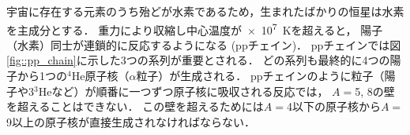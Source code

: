 \documentclass[../master]{subfiles}
\begin{document}
宇宙に存在する元素のうち殆どが水素であるため，生まれたばかりの恒星は水素を主成分とする．
重力により収縮し中心温度が\SI{e7}{\kelvin}を超えると，
陽子（水素）同士が連鎖的に反応するようになる (ppチェイン)．
ppチェインでは図\ref{fig::pp_chain}に示した3つの系列が重要とされる．
どの系列も最終的に4つの陽子から1つの${}^{4}\mathrm{He}$原子核（$\alpha$粒子）が生成される．
ppチェインのように粒子（陽子や$3{}^{3}\mathrm{He}$など）が順番に一つずつ原子核に吸収される反応では，
$A = $5, 8の壁を超えることはできない．
この壁を超えるためには$A = $4以下の原子核から$A = $9以上の原子核が直接生成されなければならない．
\end{document}
